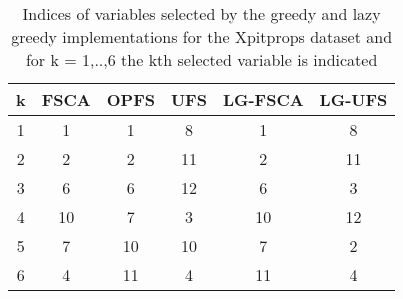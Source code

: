 \begin{table}
	\begin{center}
		\begin{tabular}{c c c c c c}
			k & FSCA & OPFS & UFS & LG-FSCA & LG-UFS \\
			\hline
			1 & 1 & 1 & 8 & 1 & 8 \\
			2 & 2 & 2 & 11 & 2 & 11 \\
			3 & 6 & 6 & 12 & 6 & 3 \\
			4 & 10 & 7 & 3 & 10 & 12 \\
			5 & 7 & 10 & 10 & 7 & 2 \\
			6 & 4 & 11 & 4 & 11 & 4 \\
		\end{tabular}
	\end{center}
	\caption{Indices of variables selected by the greedy and lazy greedy implementations for the Xpitprops dataset and for k = 1,..,6 the kth selected variable is indicated}
\end{table}